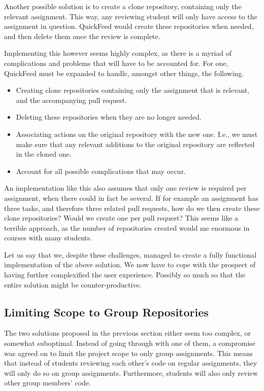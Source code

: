 Another possible solution is to create a clone repository, containing only the relevant assignment. 
This way, any reviewing student will only have access to the assignment in question.
QuickFeed would create these repositories when needed, and then delete them once the review is complete.

Implementing this however seems highly complex, as there is a myriad of complications and problems that will have to be accounted for.
For one, QuickFeed must be expanded to handle, amongst other things, the following.

\begin{itemize}
    \item Creating clone repositories containing only the assignment that is relevant, and the accompanying pull request.
    \item Deleting these repositories when they are no longer needed.
    \item Associating actions on the original repository with the new one.
    I.e., we must make sure that any relevant additions to the original repository are reflected in the cloned one.
    \item Account for all possible complications that may occur.
\end{itemize}

An implementation like this also assumes that only one review is required per assignment, when there could in fact be several.
If for example an assignment has three tasks, and therefore three related pull requests, how do we then create these clone repositories?
Would we create one per pull request?
This seems like a terrible approach, as the number of repositories created would me enormous in courses with many students.

Let us say that we, despite these challenges, managed to create a fully functional implementation of the above solution.
We now have to cope with the prospect of having further complexified the user experience.
Possibly so much so that the entire solution might be counter-productive.

\subsection{Limiting Scope to Group Repositories}

The two solutions proposed in the previous section either seem too complex, or somewhat suboptimal.
Instead of going through with one of them, a compromise was agreed on to limit the project scope to only group assignments.
This means that instead of students reviewing each other's code on regular assignments, they will only do so on group assignments.
Furthermore, students will also only review other group members' code.

